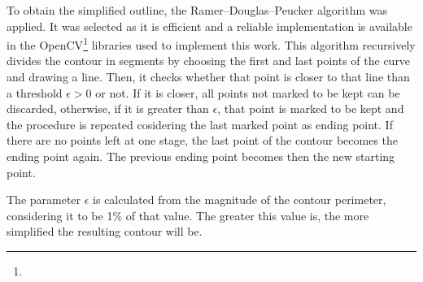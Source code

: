 To obtain the simplified outline, the Ramer–Douglas–Peucker algorithm  was applied. It was selected as it is efficient and a reliable implementation is available in the OpenCV\footnote{} libraries used to implement this work. This algorithm recursively divides the contour in segments by choosing the first and last points of the curve and drawing a line. Then, it checks whether that point is closer to that line than a threshold $\epsilon > 0$ or not. If it is closer, all points not marked to be kept can be discarded, otherwise, if it is greater than $\epsilon$, that point is marked to be kept and the procedure is repeated cosidering the last marked point as ending point. If there are no points left at one stage, the last point of the contour becomes the ending point again. The previous ending point becomes then the new starting point.

The parameter $\epsilon$ is calculated from the magnitude of the contour perimeter, considering it to be 1\% of that value. The greater this value is, the more simplified the resulting contour will be.